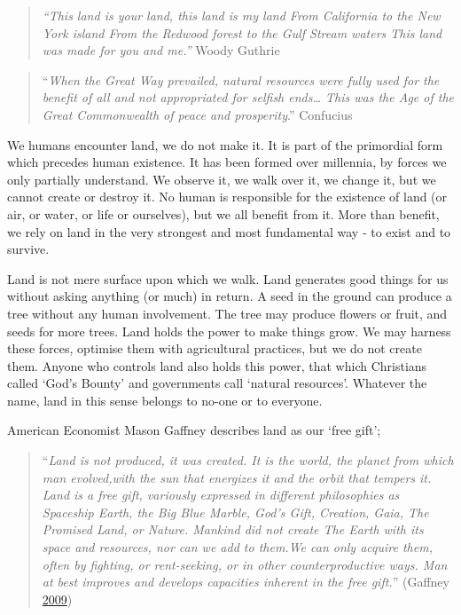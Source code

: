 \documentclass[]{tufte-handout}
\begin{document}
\begin{quote}
\emph{``This land is your land, this land is my land From California to
the New York island From the Redwood forest to the Gulf Stream waters
This land was made for you and me.''} Woody Guthrie
\end{quote}

\begin{quote}
``\emph{When the Great Way prevailed, natural resources were fully used
for the benefit of all and not appropriated for selfish ends\ldots{}
This was the Age of the Great Commonwealth of peace and prosperity}.''
Confucius
\end{quote}

We humans encounter land, we do not make it. It is part of the
primordial form which precedes human existence. It has been formed over
millennia, by forces we only partially understand. We observe it, we
walk over it, we change it, but we cannot create or destroy it. No human
is responsible for the existence of land (or air, or water, or life or
ourselves), but we all benefit from it. More than benefit, we rely on
land in the very strongest and most fundamental way - to exist and to
survive.

Land is not mere surface upon which we walk. Land generates good things
for us without asking anything (or much) in return. A seed in the ground
can produce a tree without any human involvement. The tree may produce
flowers or fruit, and seeds for more trees. Land holds the power to make
things grow. We may harness these forces, optimise them with
agricultural practices, but we do not create them. Anyone who controls
land also holds this power, that which Christians called `God's Bounty'
and governments call `natural resources'. Whatever the name, land in
this sense belongs to no-one or to everyone.

American Economist Mason Gaffney describes land as our `free gift';

\begin{quote}
``\emph{Land is not produced, it was created. It is the world, the
planet from which man evolved,with the sun that energizes it and the
orbit that tempers it. Land is a free gift, variously expressed in
different philosophies as Spaceship Earth, the Big Blue Marble, God's
Gift, Creation, Gaia, The Promised Land, or Nature. Mankind did not
create The Earth with its space and resources, nor can we add to them.We
can only acquire them, often by fighting, or rent-seeking, or in other
counterproductive ways. Man at best improves and develops capacities
inherent in the free gift.}'' (Gaffney
\protect\hyperlink{ref-Gaffney2009}{2009})
\end{quote}
\end{document}
